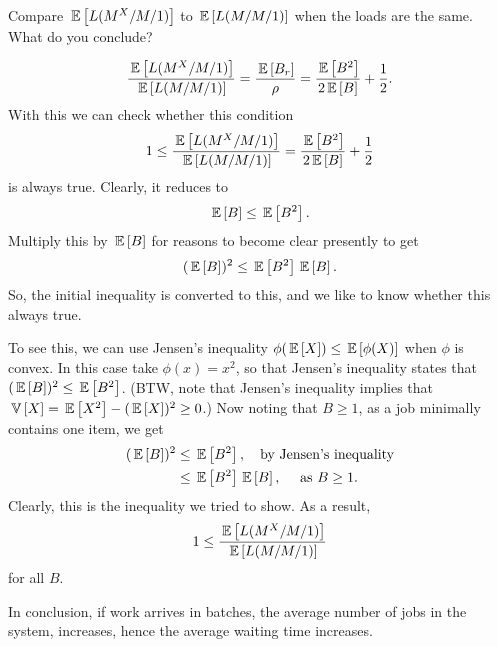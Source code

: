 \begin{question}
  Compare $\,\mathbb{E}\left[L(M^X/M/1)\right]$ to $\,\mathbb{E}\left[L(M/M/1)\right]$ when the loads are the
    same. What do you conclude?

  \begin{solution}
    \begin{equation*}
    \frac{\,\mathbb{E}\left[L(M^X/M/1)\right]}{\,\mathbb{E}\left[L(M/M/1)\right]} = \frac{\,\mathbb{E}\left[B_r\right]}{\rho} = 
\frac{\,\mathbb{E}\left[B^2\right]}{2\,\mathbb{E}\left[B\right]} + \frac 12.
    \end{equation*}
With this we can check whether this condition
    \begin{equation*}
    1\leq \frac{\,\mathbb{E}\left[L(M^X/M/1)\right]}{\,\mathbb{E}\left[L(M/M/1)\right]} = \frac{\,\mathbb{E}\left[B^2\right]}{2\,\mathbb{E}\left[B\right]} + \frac 12
    \end{equation*}
    is always true. Clearly, it reduces to
\begin{equation*}
\,\mathbb{E}\left[B\right] \leq  \,\mathbb{E}\left[B^2\right].
\end{equation*}
Multiply this by $\,\mathbb{E}\left[B\right]$ for reasons to become clear presently to get
\begin{equation*}
(\,\mathbb{E}\left[B\right])^2 \leq  \,\mathbb{E}\left[B^2\right] \,\mathbb{E}\left[B\right].
\end{equation*}
So, the initial inequality is converted to this, and we like to know
whether this always true.


To see this, we can use Jensen's inequality
$\phi(\,\mathbb{E}\left[X\right]) \leq \,\mathbb{E}\left[\phi(X)\right]$ when $\phi$ is convex. In this case take
$\phi(x)=x^2$, so that Jensen's inequality states that
$(\,\mathbb{E}\left[B\right])^2 \leq \,\mathbb{E}\left[B^2\right]$. (BTW, note that Jensen's inequality implies
that $\,\mathbb{V}\left[X\right] = \,\mathbb{E}\left[X^2\right] - (\,\mathbb{E}\left[X\right])^2\geq 0$.)  Now noting that $B\geq 1$, as a
job minimally contains one item, we get
\begin{equation*}
  \begin{split}
(\,\mathbb{E}\left[B\right])^2 
&\leq  \,\mathbb{E}\left[B^2\right], \quad{\text{by Jensen's inequality}} \\
&\leq   \,\mathbb{E}\left[B^2\right] \,\mathbb{E}\left[B\right], \quad{\text{ as } B \geq 1}.
  \end{split}
\end{equation*}
Clearly, this is the inequality we tried to show. As a result,
    \begin{equation*}
    1\leq \frac{\,\mathbb{E}\left[L(M^X/M/1)\right]}{\,\mathbb{E}\left[L(M/M/1)\right]}
    \end{equation*}
for all $B$. 

In conclusion, if work arrives in batches, the average number of jobs
in the system, increases, hence the average waiting time increases.

  \end{solution}
\end{question}


